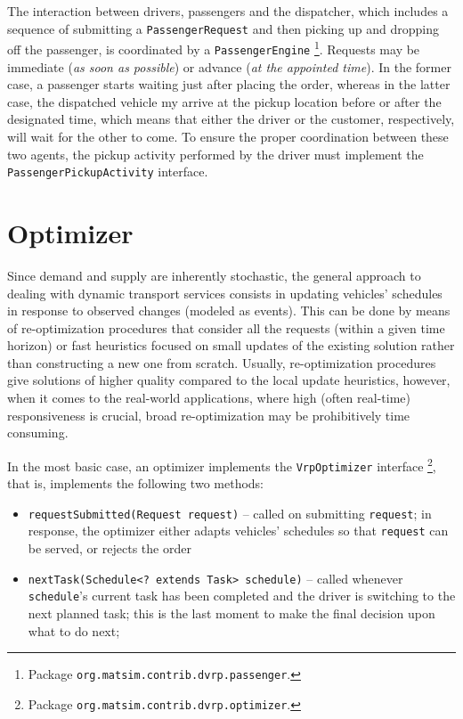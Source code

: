 The interaction between drivers, passengers and the dispatcher, which includes a sequence of submitting a \lstinline$PassengerRequest$ and then picking up and dropping off the passenger, is coordinated by a \lstinline{PassengerEngine}%
\footnote{
Package \lstinline$org.matsim.contrib.dvrp.passenger$.
}.
Requests may be immediate (\emph{as soon as possible}) or advance (\emph{at the appointed time}). In the former case, a passenger starts waiting just after placing the order, whereas in the latter case, the dispatched vehicle my arrive at the pickup location before or after the designated time, which means that either the driver or the customer, respectively, will wait for the other to come. To ensure the proper coordination between these two agents, the pickup activity performed by the driver must implement the \lstinline$PassengerPickupActivity$ interface.


\section{Optimizer}
\label{sec:VRP-optimizer}

Since demand and supply are inherently stochastic, the general approach to dealing with dynamic transport services consists in updating vehicles' schedules in response to observed changes (modeled as events). This can be done by means of re-optimization procedures that consider all the requests (within a given time horizon) or fast heuristics focused on small updates of the existing solution rather than constructing a new one from scratch. Usually, re-optimization procedures give solutions of higher quality compared to the local update heuristics, however, when it comes to the real-world applications, where high (often real-time) responsiveness is crucial, broad re-optimization may be prohibitively time consuming.

In the most basic case, an optimizer implements the \lstinline$VrpOptimizer$ interface%
\footnote{
Package \lstinline$org.matsim.contrib.dvrp.optimizer$.
},
that is, implements the following two methods:
%
\begin{itemize}
	\item \lstinline$requestSubmitted(Request request)$ -- called on submitting \lstinline$request$; in response, the optimizer either adapts vehicles' schedules so that \lstinline$request$ can be served, or rejects the order
	
	\item \lstinline$nextTask(Schedule<? extends Task> schedule)$ -- called whenever \lstinline$schedule$'s current task has been completed and the driver is switching to the next planned task; this is the last moment to make the final decision upon what to do next;

\end{itemize}

